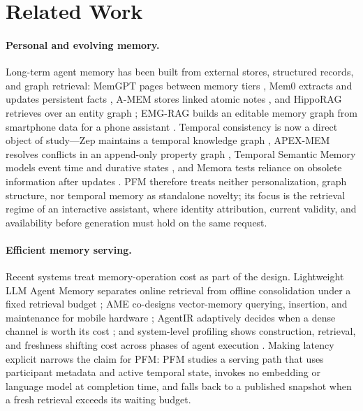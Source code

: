 \documentclass[letterpaper]{article} %
\begin{document}
\section{Related Work}

\paragraph{Personal and evolving memory.} Long-term agent memory has been built from external stores, structured records, and graph retrieval: MemGPT pages between memory tiers \citep{packer2023memgpt}, Mem0 extracts and updates persistent facts \citep{chhikara2025mem0}, A-MEM stores linked atomic notes \citep{xu2025amem}, and HippoRAG retrieves over an entity graph \citep{gutierrez2024hipporag}; EMG-RAG builds an editable memory graph from smartphone data for a phone assistant \citep{wang2024emgrag}. Temporal consistency is now a direct object of study---Zep maintains a temporal knowledge graph \citep{rasmussen2025zep}, APEX-MEM resolves conflicts in an append-only property graph \citep{banerjee2026apexmem}, Temporal Semantic Memory models event time and durative states \citep{su2026tsm}, and Memora tests reliance on obsolete information after updates \citep{uddin2026memora}. PFM therefore treats neither personalization, graph structure, nor temporal memory as standalone novelty; its focus is the retrieval regime of an interactive assistant, where identity attribution, current validity, and availability before generation must hold on the same request.

\paragraph{Efficient memory serving.} Recent systems treat memory-operation cost as part of the design. Lightweight LLM Agent Memory separates online retrieval from offline consolidation under a fixed retrieval budget \citep{zhang2026lightmem}; AME co-designs vector-memory querying, insertion, and maintenance for mobile hardware \citep{zhao2025ame}; AgentIR adaptively decides when a dense channel is worth its cost \citep{yuan2026agentir}; and system-level profiling shows construction, retrieval, and freshness shifting cost across phases of agent execution \citep{omri2026agentmemory,zhou2026ready}. Making latency explicit narrows the claim for PFM: PFM studies a serving path that uses participant metadata and active temporal state, invokes no embedding or language model at completion time, and falls back to a published snapshot when a fresh retrieval exceeds its waiting budget.
\end{document}
